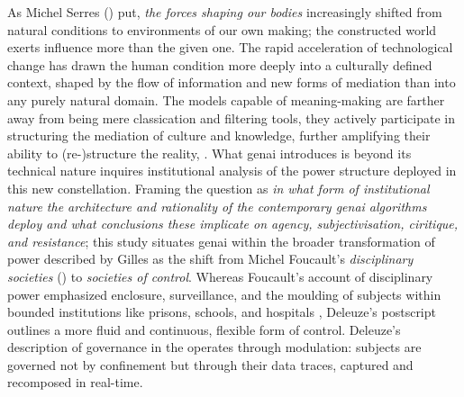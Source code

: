 


\yellowsquare
As Michel Serres (\cite*[41]{serres2019}) put, \textit{the forces shaping our bodies} increasingly
shifted from natural conditions to environments of our own making; the
constructed world exerts influence more than the given one. The rapid acceleration of technological change has drawn the human condition more deeply into a culturally defined context, shaped by the flow of information and new forms of mediation than into any purely natural domain. The models capable of meaning-making are farther away from being mere classication and filtering tools, they actively participate in structuring the mediation of culture and knowledge, further amplifying their ability to (re-)structure the reality, . What \gls{genai} introduces is beyond its technical nature inquires institutional analysis \parencite{mackenzie2021} of the power structure deployed in this new constellation. Framing the question as \emph{in what form of institutional nature the architecture and rationality of the contemporary \gls{genai} algorithms deploy and what conclusions these implicate on agency, subjectivisation, ciritique, and resistance}; this study situates \gls{genai} within the broader transformation of power described by Gilles \textcite{deleuze1992a} as the shift from Michel Foucault's \emph{disciplinary societies} (\cite*{Foucault1977}) to \emph{societies of control}. Whereas Foucault’s account of disciplinary power emphasized enclosure, surveillance, and the moulding of subjects within bounded institutions like prisons, schools, and hospitals \parencite{foucault2008}, Deleuze's postscript outlines a more fluid and continuous, flexible form of control. Deleuze's description of governance in the  operates through modulation: subjects are governed not by confinement but through their data traces, captured and recomposed in real-time.
